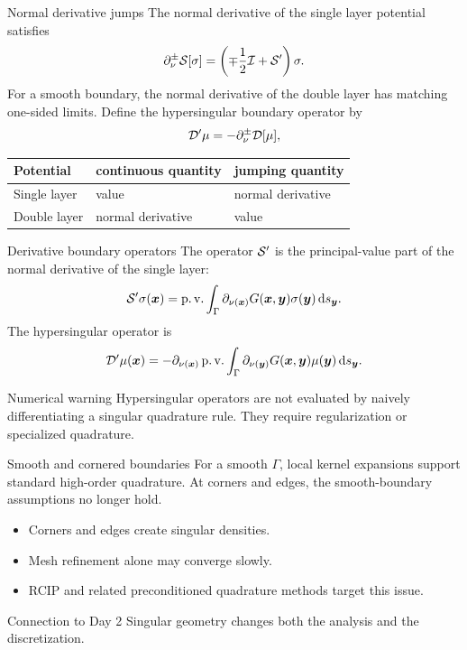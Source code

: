 \documentclass[aspectratio=169,11pt]{beamer}
\newcommand{\dd}{\,\mathrm d}
\newcommand{\x}{\bm{x}}
\newcommand{\y}{\bm{y}}
\begin{document}
\begin{frame}{Normal derivative jumps}
\small
The normal derivative of the single layer potential satisfies
\[
  \partial_\nu^\pm \mathcal{S}[\sigma]
  =
  \left(\mp\frac12\mathcal{I}+\mathcal{S}^{\prime}\right)\sigma.
\]
For a smooth boundary, the normal derivative of the double layer has matching
one-sided limits.  Define the hypersingular boundary operator by
\[
  \mathcal{D}^{\prime}\mu=-\partial_\nu^\pm \mathcal{D}[\mu],
\]

\begin{center}
\renewcommand{\arraystretch}{1.25}
\begin{tabular}{lll}
\toprule
Potential & continuous quantity & jumping quantity \\
\midrule
Single layer & value & normal derivative \\
Double layer & normal derivative & value \\
\bottomrule
\end{tabular}
\end{center}
\end{frame}

\begin{frame}{Derivative boundary operators}
\small
The operator $\mathcal{S}^{\prime}$ is the principal-value part of the normal derivative of
the single layer:
\[
\Spop\sigma(\x)
=\operatorname{p.v.}\int_\Gamma
\partial_{\nu(\x)}G(\x,\y)\sigma(\y)\dd s_{\y}.
\]
The hypersingular operator is
\[
\Dpop\mu(\x)
=-\partial_{\nu(\x)}
\operatorname{p.v.}\int_\Gamma
\partial_{\nu(\y)}G(\x,\y)\mu(\y)\dd s_{\y}.
\]

\begin{block}{Numerical warning}
Hypersingular operators are not evaluated by naively differentiating a
singular quadrature rule. They require regularization or specialized
quadrature.
\end{block}
\end{frame}

\begin{frame}{Smooth and cornered boundaries}
\small
For a smooth $\Gamma$, local kernel expansions support standard high-order
quadrature.  At corners and edges, the smooth-boundary assumptions no longer
hold.

\begin{itemize}
  \item Corners and edges create singular densities.
  \item Mesh refinement alone may converge slowly.
  \item RCIP and related preconditioned quadrature methods target this issue.
\end{itemize}

\begin{block}{Connection to Day 2}
Singular geometry changes both the analysis and the discretization.
\end{block}
\end{frame}
\end{document}

